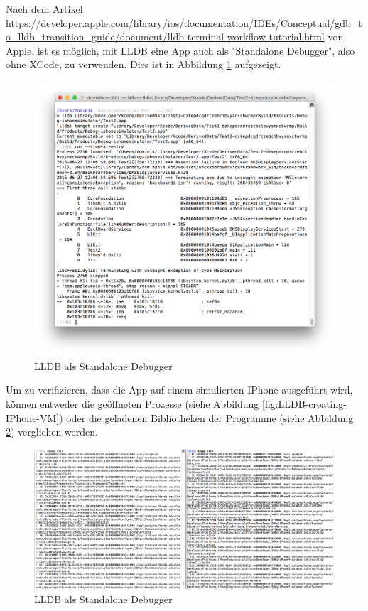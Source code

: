 Nach dem Artikel \url{https://developer.apple.com/library/ios/documentation/IDEs/Conceptual/gdb_to_lldb_transition_guide/document/lldb-terminal-workflow-tutorial.html} von Apple, ist es möglich, mit  LLDB eine App auch als "Standalone Debugger", also ohne XCode, zu verwenden. Dies ist in Abbildung \ref{fig:LLDBStandaloneDebugger} aufgezeigt.

\begin{figure}[htbp]
	\centering
	\includegraphics[width=\textwidth]{bilder/pentest_mobile_anwendungen/vergleich_aktuelle_situation/20160627_LLDB-Standalone-Debugger.png}
	\caption{LLDB als Standalone Debugger}
	\label{fig:LLDBStandaloneDebugger}
\end{figure}

Um zu verifizieren, dass die App auf einem simulierten IPhone ausgeführt wird, können entweder die geöffneten Prozesse (siehe Abbildung \ref{fig:LLDB-creating-IPhone-VM}) oder die geladenen Bibliotheken der Programme (siehe Abbildung \ref{fig:VergleichLLDBImages}) verglichen werden.

\begin{figure}[htbp]
	\centering
	\includegraphics[width=\textwidth]{bilder/pentest_mobile_anwendungen/vergleich_aktuelle_situation/20160627_LLDB-image-list.png}
	\caption{LLDB als Standalone Debugger}
	\label{fig:VergleichLLDBImages}
\end{figure}

